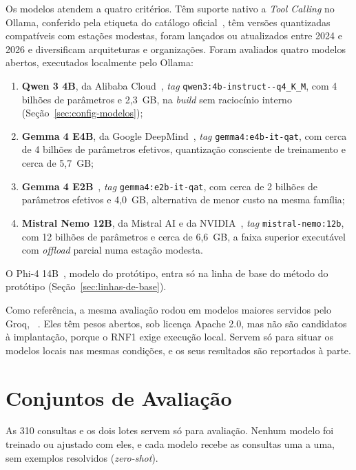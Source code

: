 Os modelos atendem a quatro critérios. Têm suporte nativo a \textit{Tool Calling} no Ollama, conferido pela etiqueta do catálogo oficial~\cite{ollama2023}, têm versões quantizadas compatíveis com estações modestas, foram lançados ou atualizados entre 2024 e 2026 e diversificam arquiteturas e organizações. Foram avaliados quatro modelos abertos, executados localmente pelo Ollama:
\begin{enumerate}
  \item \textbf{Qwen 3 4B}, da Alibaba Cloud~\cite{qwen2025qwen3}, \textit{tag} \texttt{qwen3:4b-instruct--q4\_K\_M}, com 4 bilhões de parâmetros e 2,3~GB, na \textit{build} sem raciocínio interno (Seção~\ref{sec:config-modelos});
  \item \textbf{Gemma 4 E4B}, da Google DeepMind~\cite{team2026gemma4}, \textit{tag} \texttt{gemma4:\allowbreak e4b-it-qat}, com cerca de 4 bilhões de parâmetros efetivos, quantização consciente de treinamento e cerca de 5,7~GB;
  \item \textbf{Gemma 4 E2B}~\cite{team2026gemma4}, \textit{tag} \texttt{gemma4:\allowbreak e2b-it-qat}, com cerca de 2 bilhões de parâmetros efetivos e 4,0~GB, alternativa de menor custo na mesma família;
  \item \textbf{Mistral Nemo 12B}, da Mistral AI e da NVIDIA~\cite{mistral2024nemo}, \textit{tag} \texttt{mistral-nemo:\allowbreak 12b}, com 12 bilhões de parâmetros e cerca de 6,6~GB, a faixa superior executável com \textit{offload} parcial numa estação modesta.
\end{enumerate}

O Phi-4 14B~\cite{abdin2024phi4}, modelo do protótipo, entra só na linha de base do método do protótipo (Seção~\ref{sec:linhas-de-base}).

Como referência, a mesma avaliação rodou em  modelos maiores servidos pelo Groq, ~\cite{qwen2026qwen38, openai2025gptoss}. Eles têm pesos abertos, sob licença Apache 2.0, mas não são candidatos à implantação, porque o RNF1 exige execução local. Servem só para situar os modelos locais nas mesmas condições, e os seus resultados são reportados à parte.

\section{Conjuntos de Avaliação}
\label{sec:dataset}

As 310 consultas e os dois lotes servem só para avaliação. Nenhum modelo foi treinado ou ajustado com eles, e cada modelo recebe as consultas uma a uma, sem exemplos resolvidos (\textit{zero-shot}).

